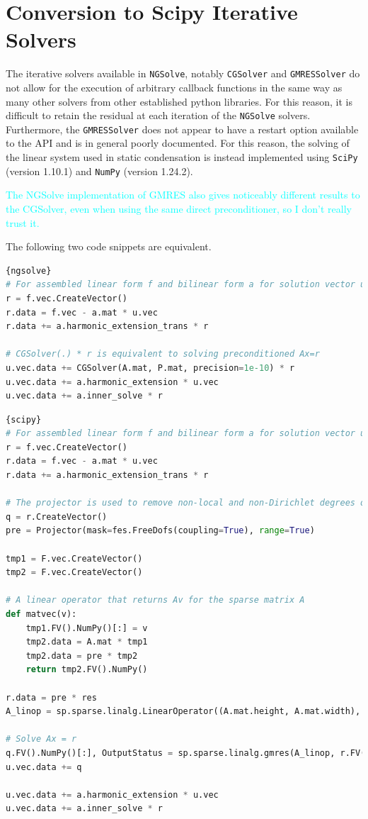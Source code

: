 \documentclass[a4paper,12]{elsarticle}
\theoremstyle{definition}
\begin{document}
\section{Conversion to Scipy Iterative Solvers} \label{sect:scipy}
The iterative solvers available in \texttt{NGSolve}, notably \texttt{CGSolver} and \texttt{GMRESSolver} do not allow for the execution of arbitrary callback functions in the same way as many other solvers from other established python libraries. For this reason, it is difficult to retain the residual at each iteration of the \texttt{NGSolve} solvers. Furthermore, the \texttt{GMRESSolver} does not appear to have a restart option available to the API and is in general poorly documented. For this reason, the solving of the linear system used in static condensation is instead implemented using \texttt{SciPy} (version 1.10.1) and \texttt{NumPy} (version 1.24.2).

\textcolor{cyan}{The NGSolve implementation of GMRES also gives noticeably different results to the CGSolver, even when using the same direct preconditioner, so I don't really trust it.}

The following two code snippets are equivalent.
\clearpage
\begin{lstlisting}[caption=Static condensation using NGSolve,frame=tlrb, language=python]{ngsolve}
# For assembled linear form f and bilinear form a for solution vector u. 
r = f.vec.CreateVector()
r.data = f.vec - a.mat * u.vec
r.data += a.harmonic_extension_trans * r

# CGSolver(.) * r is equivalent to solving preconditioned Ax=r
u.vec.data += CGSolver(A.mat, P.mat, precision=1e-10) * r
u.vec.data += a.harmonic_extension * u.vec
u.vec.data += a.inner_solve * r
\end{lstlisting}

\begin{lstlisting}[caption=Static condensation using SciPy,frame=tlrb, language=python]{scipy}
# For assembled linear form f and bilinear form a for solution vector u. 
r = f.vec.CreateVector()
r.data = f.vec - a.mat * u.vec
r.data += a.harmonic_extension_trans * r

# The projector is used to remove non-local and non-Dirichlet degrees of freedom that should not participate in the solve
q = r.CreateVector()
pre = Projector(mask=fes.FreeDofs(coupling=True), range=True)

tmp1 = F.vec.CreateVector()
tmp2 = F.vec.CreateVector()

# A linear operator that returns Av for the sparse matrix A
def matvec(v):
	tmp1.FV().NumPy()[:] = v
	tmp2.data = A.mat * tmp1
	tmp2.data = pre * tmp2
	return tmp2.FV().NumPy()

r.data = pre * res
A_linop = sp.sparse.linalg.LinearOperator((A.mat.height, A.mat.width), matvec)

# Solve Ax = r
q.FV().NumPy()[:], OutputStatus = sp.sparse.linalg.gmres(A_linop, r.FV().NumPy(), tol=1e-10, M=P.mat)
u.vec.data += q

u.vec.data += a.harmonic_extension * u.vec
u.vec.data += a.inner_solve * r
\end{lstlisting}
\end{document}
